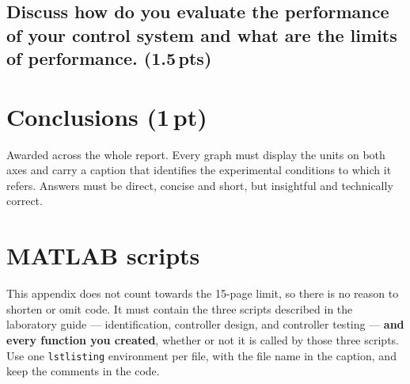 \documentclass[a4paper,12pt]{article}
\begin{document}

\subsection{Discuss how do you evaluate the performance of your control system and what are the limits of performance. (1.5\,pts)}
\vspace{10pt}



\section*{Conclusions (1\,pt)}



\vspace{20pt}
\begin{tcolorbox}[mybox, title={Presentation (1.5\,pts)}]
Awarded across the whole report. Every graph must display the units on both axes and carry a
caption that identifies the experimental conditions to which it refers. Answers must be direct,
concise and short, but insightful and technically correct.
\end{tcolorbox}


\newpage
\appendix
\section{MATLAB scripts}
\label{app:scripts}

This appendix does not count towards the 15-page limit, so there is no reason to shorten or
omit code. It must contain the three scripts described in the laboratory guide ---
identification, controller design, and controller testing --- \textbf{and every function you
created}, whether or not it is called by those three scripts. Use one \texttt{lstlisting}
environment per file, with the file name in the caption, and keep the comments in the code.

\begin{lstlisting}[caption={\texttt{identification.m} --- script for model identification.}]
% your code here
\end{lstlisting}

\begin{lstlisting}[caption={\texttt{controller\_design.m} --- script for controller design.}]
% your code here
\end{lstlisting}

\begin{lstlisting}[caption={\texttt{controller\_test.m} --- script for controller testing.}]
% your code here
\end{lstlisting}

\begin{lstlisting}[caption={\texttt{yourFunctionName.m} --- one listing per function you created.}]
% your code here
\end{lstlisting}
\end{document}
